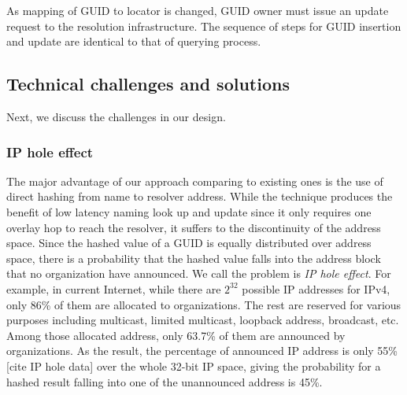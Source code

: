         As mapping of GUID to locator is changed, GUID owner must issue an update request to the resolution infrastructure. The sequence of steps for GUID insertion and update are identical to that of querying process.

     \subsection{Technical challenges and solutions}
        Next, we discuss the challenges in our design.
        \subsubsection{IP hole effect}
        \label{subsub:replication}

        The major advantage of our approach comparing to existing ones is the use of direct hashing from name to resolver address. While the technique produces the benefit of low latency naming look up and update since it only requires one overlay hop to reach the resolver, it suffers to the discontinuity of the address space. Since the hashed value of a GUID is equally distributed over address space, there is a probability that the hashed value falls into the address block that no organization have announced. We call the problem is \emph{IP hole effect}. %
        For example, in current Internet, while there are $2^{32}$ possible IP addresses for IPv4, only 86\% of them are allocated to organizations. The rest are reserved for various purposes including multicast, limited multicast, loopback address, broadcast, etc. Among those allocated address, only 63.7\% of them are announced by organizations. As the result, the percentage of announced IP address is only 55\%[cite IP hole data] over the whole 32-bit IP space, giving the probability for a hashed result falling into one of the unannounced address is 45\%.

